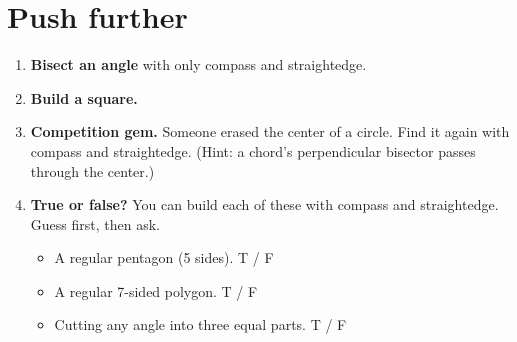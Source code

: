 \documentclass[11pt]{article}
\begin{document}
\section*{Push further}
\begin{enumerate}[leftmargin=*]
  \item \textbf{Bisect an angle} with only compass and straightedge.
  \item \textbf{Build a square.}
  \item \textbf{Competition gem.} Someone erased the center of a circle. Find it
        again with compass and straightedge. (Hint: a chord's perpendicular
        bisector passes through the center.)
  \item \textbf{True or false?} You can build each of these with compass and
        straightedge. Guess first, then ask.
        \begin{itemize}
          \item A regular pentagon (5 sides). \hfill T \quad / \quad F
          \item A regular 7-sided polygon. \hfill T \quad / \quad F
          \item Cutting any angle into three equal parts. \hfill T \quad / \quad F
        \end{itemize}
\end{enumerate}
\end{document}
